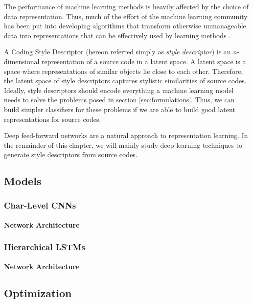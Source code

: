 The performance of machine learning methods is heavily affected by the choice of data representation. Thus, much of the effort of the machine learning community has been put into developing algorithms that transform otherwise unmanageable data into representations that can be effectively used by learning methods \cite{representation_learning}.

A Coding Style Descriptor (hereon referred simply as \textit{style descriptor}) is an $n$-dimensional representation of a source code in a latent space. A latent space is a space where representations of similar objects lie close to each other. Therefore, the latent space of style descriptors captures stylistic similarities of source codes. Ideally, style descriptors should encode everything a machine learning model needs to solve the problems posed in section \ref{sec:formulations}. Thus, we can build simpler classifiers for these problems if we are able to build good latent representations for source codes.


Deep feed-forward networks are a natural approach to representation learning. In the remainder of this chapter, we will mainly study deep learning techniques to generate style descriptors from source codes.

\subsection{Models}\label{sec:models}
\subsubsection{Char-Level CNNs}
\paragraph*{Network Architecture}
\subsubsection{Hierarchical LSTMs}
\paragraph*{Network Architecture}

\subsection{Optimization}\label{sec:optimization}

